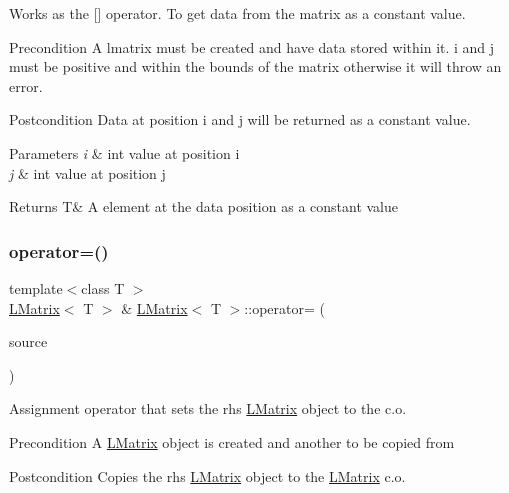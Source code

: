 Works as the \mbox{[}\mbox{]} operator. To get data from the matrix as a constant value. 

\begin{DoxyPrecond}{Precondition}
A lmatrix must be created and have data stored within it. i and j must be positive and within the bounds of the matrix otherwise it will throw an error. 
\end{DoxyPrecond}
\begin{DoxyPostcond}{Postcondition}
Data at position i and j will be returned as a constant value.
\end{DoxyPostcond}

\begin{DoxyParams}{Parameters}
{\em i} & int value at position i \\
\hline
{\em j} & int value at position j \\
\hline
\end{DoxyParams}
\begin{DoxyReturn}{Returns}
T\& A element at the data position as a constant value 
\end{DoxyReturn}
\mbox{\label{class_l_matrix_ad4feb8e3706e9ce8fdb07e63d985f52f}} 
\subsubsection{\texorpdfstring{operator=()}{operator=()}\hspace{0.1cm}{\footnotesize\ttfamily [1/2]}}
{\footnotesize\ttfamily template$<$class T $>$ \\
\mbox{\hyperlink{class_l_matrix}{L\+Matrix}}$<$ T $>$ \& \mbox{\hyperlink{class_l_matrix}{L\+Matrix}}$<$ T $>$\+::operator= (\begin{DoxyParamCaption}\item[{const \mbox{\hyperlink{class_l_matrix}{L\+Matrix}}$<$ T $>$ \&}]{source }\end{DoxyParamCaption})\hspace{0.3cm}{\ttfamily [virtual]}}



Assignment operator that sets the rhs \mbox{\hyperlink{class_l_matrix}{L\+Matrix}} object to the c.\+o. 

\begin{DoxyPrecond}{Precondition}
A \mbox{\hyperlink{class_l_matrix}{L\+Matrix}} object is created and another to be copied from 
\end{DoxyPrecond}
\begin{DoxyPostcond}{Postcondition}
Copies the rhs \mbox{\hyperlink{class_l_matrix}{L\+Matrix}} object to the \mbox{\hyperlink{class_l_matrix}{L\+Matrix}} c.\+o. 
\end{DoxyPostcond}

